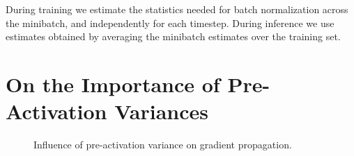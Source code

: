 \documentclass{article} %
\begin{document}
During training we estimate the statistics needed for batch normalization across the minibatch, and independently for each timestep.
During inference we use estimates obtained by averaging the minibatch estimates over the training set.







\section{On the Importance of Pre-Activation Variances}


\begin{figure}
  \center%
  \hspace{2mm}%
  \caption{
Influence of pre-activation variance on gradient propagation.
}
  \label{figure:DCNtradeoff}
\end{figure}
\end{document}
